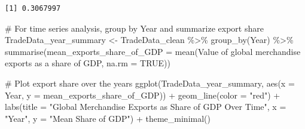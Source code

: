 \documentclass[
  10pt,
]{article}
\newenvironment{Shaded}{\begin{snugshade}}{\end{snugshade}}
\newcommand{\AttributeTok}[1]{\textcolor[rgb]{0.40,0.45,0.13}{#1}}
\newcommand{\CommentTok}[1]{\textcolor[rgb]{0.37,0.37,0.37}{#1}}
\newcommand{\ConstantTok}[1]{\textcolor[rgb]{0.56,0.35,0.01}{#1}}
\newcommand{\FunctionTok}[1]{\textcolor[rgb]{0.28,0.35,0.67}{#1}}
\newcommand{\NormalTok}[1]{\textcolor[rgb]{0.00,0.23,0.31}{#1}}
\newcommand{\OtherTok}[1]{\textcolor[rgb]{0.00,0.23,0.31}{#1}}
\newcommand{\SpecialCharTok}[1]{\textcolor[rgb]{0.37,0.37,0.37}{#1}}
\newcommand{\StringTok}[1]{\textcolor[rgb]{0.13,0.47,0.30}{#1}}
\begin{document}
\begin{Shaded}
\end{Shaded}

\begin{verbatim}
[1] 0.3067997
\end{verbatim}

\begin{Shaded}
\begin{Highlighting}[]
\CommentTok{\# For time series analysis, group by Year and summarize export share}
\NormalTok{TradeData\_year\_summary }\OtherTok{\textless{}{-}}\NormalTok{ TradeData\_clean }\SpecialCharTok{\%\textgreater{}\%}
  \FunctionTok{group\_by}\NormalTok{(Year) }\SpecialCharTok{\%\textgreater{}\%}
  \FunctionTok{summarise}\NormalTok{(}\AttributeTok{mean\_exports\_share\_of\_GDP =} \FunctionTok{mean}\NormalTok{(}\StringTok{\textasciigrave{}}\AttributeTok{Value of global merchandise exports as a share of GDP}\StringTok{\textasciigrave{}}\NormalTok{, }\AttributeTok{na.rm =} \ConstantTok{TRUE}\NormalTok{))}

\CommentTok{\# Plot export share over the years}
\FunctionTok{ggplot}\NormalTok{(TradeData\_year\_summary, }\FunctionTok{aes}\NormalTok{(}\AttributeTok{x =}\NormalTok{ Year, }\AttributeTok{y =}\NormalTok{ mean\_exports\_share\_of\_GDP)) }\SpecialCharTok{+}
  \FunctionTok{geom\_line}\NormalTok{(}\AttributeTok{color =} \StringTok{"red"}\NormalTok{) }\SpecialCharTok{+}
  \FunctionTok{labs}\NormalTok{(}\AttributeTok{title =} \StringTok{"Global Merchandise Exports as Share of GDP Over Time"}\NormalTok{, }
       \AttributeTok{x =} \StringTok{"Year"}\NormalTok{, }
       \AttributeTok{y =} \StringTok{"Mean Share of GDP"}\NormalTok{) }\SpecialCharTok{+}
  \FunctionTok{theme\_minimal}\NormalTok{()}
\end{Highlighting}
\end{Shaded}
\end{document}
